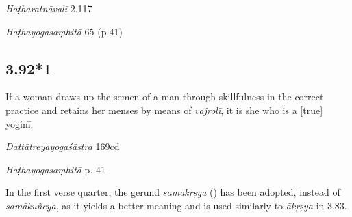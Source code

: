 \begin{ekdosis}
\begin{testimonia}[hp03_092]
\emph{Haṭharatnāvalī} 2.117
\begin{versinnote}
\end{versinnote}

\emph{Haṭhayogasaṃhitā} 65 (p.41)
\begin{versinnote}
\end{versinnote}
\end{testimonia}



\subsection*{3.92*1}
\begin{translation}[hp03_092_1]
If a woman draws up the semen of a man through skillfulness in the correct practice and retains her menses by means of \emph{vajrolī}, it is she who is a [true] yoginī.
\end{translation}

\begin{sources}[hp03_092_1]
\emph{Dattātreyayogaśāstra} 169cd
\begin{versinnote}
\end{versinnote}
\end{sources}

\begin{testimonia}[hp03_092_1]
\emph{Haṭhayogasaṃhitā} p. 41
\begin{versinnote}
\end{versinnote}
\end{testimonia}

\begin{philcomm}[hp03_092_1]
In the first verse quarter, the gerund \emph{samākṛṣya} (\textgamma) has been adopted, instead of \emph{samākuñcya}, as it yields a better meaning and is used similarly to \emph{ākṛṣya} in 3.83.


\end{philcomm}
\end{ekdosis}

